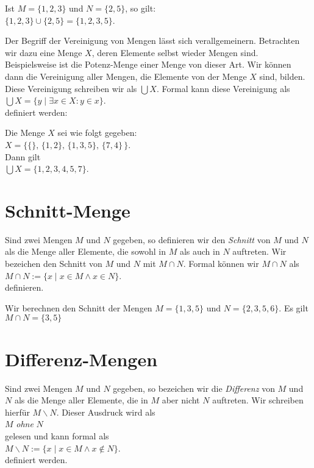 \example 
Ist  $M = \{1,2,3\}$ und $N = \{2,5\}$, so gilt: \\[0.2cm]
\hspace*{1.3cm} $\{1,2,3\} \cup \{2,5\} = \{1,2,3,5\}$.  \eox


Der Begriff der Vereinigung von Mengen l\"{a}sst sich verallgemeinern.  Betrachten
wir dazu eine Menge $X$, deren Elemente selbst wieder Mengen sind. Beispielsweise ist die Potenz-Menge 
einer Menge von dieser Art.  Wir k\"{o}nnen dann die Vereinigung aller Mengen, die Elemente
von der Menge $X$ sind, bilden.  Diese Vereinigung schreiben wir als $\bigcup X$.  Formal
kann diese Vereinigung als
\\[0.2cm]
\hspace*{1.3cm} $\bigcup X = \{ y \;|\; \exists x \in X: y \in x \}$.
\\[0.2cm]
 definiert werden:

\example
Die Menge $X$ sei wie folgt gegeben: \\[0.2cm]
\hspace*{1.3cm}
 $X = \big\{ \{\},\, \{1,2\}, \, \{1,3,5\}, \, \{7,4\}\,\big\}$. \\[0.2cm]
Dann gilt \\[0.2cm]
\hspace*{1.3cm}
 $\bigcup X = \{ 1, 2, 3, 4, 5, 7 \}$. \eox

\section{Schnitt-Menge}
Sind zwei Mengen $M$ und $N$ gegeben, so definieren wir den \emph{Schnitt} von
$M$ und $N$ als die Menge aller Elemente, die sowohl in $M$ als auch in $N$
auftreten.  Wir bezeichen den Schnitt von $M$ und $N$ mit $M \cap N$.
Formal k\"{o}nnen wir $M \cap N$ als 
\\[0.2cm]
\hspace*{1.3cm} $M \cap N := \{ x \mid x \in M \wedge x \in N \}$.
\\[0.2cm]
definieren.


\example
Wir berechnen den Schnitt der  Mengen $M = \{ 1, 3, 5 \}$ und $N = \{ 2, 3, 5, 6 \}$.  Es gilt
\\[0.2cm]
\hspace*{1.3cm} $M \cap N = \{ 3, 5 \}$
\eox

\section{Differenz-Mengen}
 Sind zwei Mengen $M$ und $N$ gegeben, so bezeichen wir die \emph{Differenz} von
 $M$ und $N$ als die Menge aller Elemente, die in $M$ aber nicht $N$
 auftreten.  Wir schreiben hierf\"{u}r $M \backslash N$.  Dieser Ausdruck wird als
\\[0.2cm]
\hspace*{1.3cm}
$M$ \emph{ohne} $N$
\\[0.2cm]
gelesen und kann formal als
 \\[0.2cm]
\hspace*{1.3cm} $M \backslash N := \{ x \mid x \in M \wedge x \not\in N \}$. 
 \\[0.2cm] 
definiert werden.


